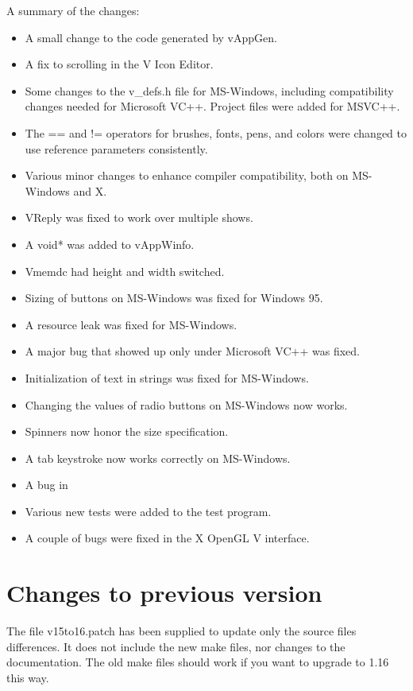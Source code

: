 \begin{description}
A summary of the changes:
\begin{itemize}
\item A small change to the code generated by vAppGen.
\item A fix to scrolling in the V Icon Editor.
\item Some changes to the v_defs.h file for MS-Windows, including
compatibility changes needed for Microsoft VC++. Project files were
added for MSVC++.
\item The == and != operators for brushes, fonts, pens, and colors were
changed to use reference parameters consistently.
\item Various minor changes to enhance compiler compatibility, both
on MS-Windows and X.
\item VReply was fixed to work over multiple shows.
\item A void* was added to vAppWinfo.
\item Vmemdc had height and width switched.
\item Sizing of buttons on MS-Windows was fixed for Windows 95.
\item A resource leak was fixed for MS-Windows.
\item A major bug that showed up only under Microsoft VC++ was
fixed.
\item Initialization of text in strings was fixed for MS-Windows.
\item Changing the values of radio buttons on MS-Windows now works.
\item Spinners now honor the size specification.
\item A tab keystroke now works correctly on MS-Windows.
\item A bug in 
\item Various new tests were added to the test program.
\item A couple of bugs were fixed in the X OpenGL V interface.
\end{itemize}

\end{description}

\section {Changes to previous version}

The file v15to16.patch has been supplied to update only the
source files differences. It does not include the new make files,
nor changes to the documentation. The old make files should work
if you want to upgrade to 1.16 this way.

